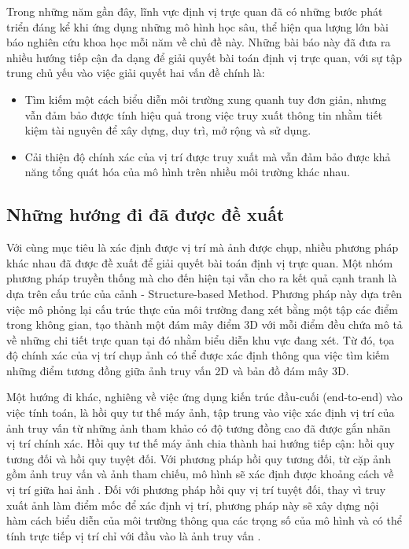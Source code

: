 Trong những năm gần đây, lĩnh vực định vị trực quan đã có những bước phát triển đáng kể khi ứng dụng những mô hình học sâu, thể hiện qua lượng lớn bài báo nghiên cứu khoa học mỗi năm về chủ đề này. Những bài báo này đã đưa ra nhiều hướng tiếp cận đa dạng để giải quyết bài toán định vị trực quan, với sự tập trung chủ yếu vào việc giải quyết hai vấn đề chính là:
\begin{itemize}
    \item Tìm kiếm một cách biểu diễn môi trường xung quanh tuy đơn giản, nhưng vẫn đảm bảo được tính hiệu quả trong việc truy xuất thông tin nhằm tiết kiệm tài nguyên để xây dựng, duy trì, mở rộng và sử dụng.
    \item Cải thiện độ chính xác của vị trí được truy xuất mà vẫn đảm bảo được khả năng tổng quát hóa của mô hình trên nhiều môi trường khác nhau.
\end{itemize}
\subsection{Những hướng đi đã được đề xuất}

Với cùng mục tiêu là xác định được vị trí mà ảnh được chụp, nhiều phương pháp khác nhau đã được đề xuất để giải quyết bài toán định vị trực quan. Một nhóm phương pháp truyền thống mà cho đến hiện tại vẫn cho ra kết quả cạnh tranh là dựa trên cấu trúc của cảnh - Structure-based Method. Phương pháp này dựa trên việc mô phỏng lại cấu trúc thực của môi trường đang xét bằng một tập các điểm trong không gian, tạo thành một đám mây điểm 3D với mỗi điểm đều chứa mô tả về những chi tiết trực quan tại đó nhằm biểu diễn khu vực đang xét. Từ đó, tọa độ chính xác của vị trí chụp ảnh có thể được xác định thông qua việc tìm kiếm những điểm tương đồng giữa ảnh truy vấn 2D và bản đồ đám mây 3D. 


Một hướng đi khác, nghiêng về việc ứng dụng kiến trúc đầu-cuối (end-to-end) vào việc tính toán, là hồi quy tư thế máy ảnh, tập trung vào việc xác định vị trí của ảnh truy vấn từ những ảnh tham khảo có độ tương đồng cao đã được gắn nhãn vị trí chính xác. Hồi quy tư thế máy ảnh chia thành hai hướng tiếp cận: hồi quy tương đối và hồi quy tuyệt đối. Với phương pháp hồi quy tương đối, từ cặp ảnh gồm ảnh truy vấn và ảnh tham chiếu, mô hình sẽ xác định được khoảng cách về vị trí giữa hai ảnh \cite{zhou2020learn}. Đối với phương pháp hồi quy vị trí tuyệt đối, thay vì truy xuất ảnh làm điểm mốc để xác định vị trí, phương pháp này sẽ xây dựng nội hàm cách biểu diễn của môi trường thông qua các trọng số của mô hình và có thể tính trực tiếp vị trí chỉ với đầu vào là ảnh truy vấn \cite{kendall2016posenet}.


